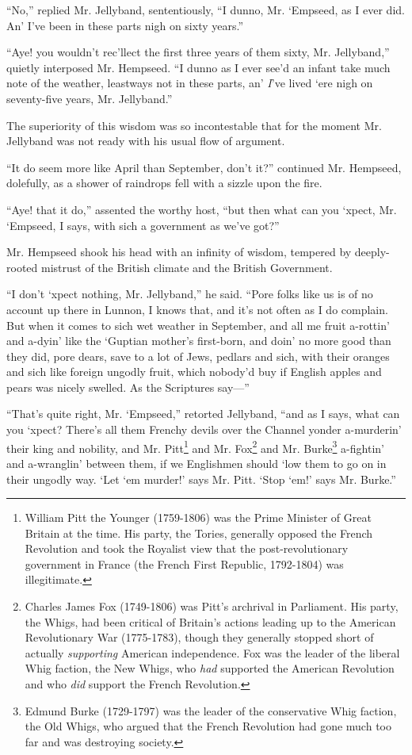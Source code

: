 \documentclass[paper=a5,BCOR=7mm,twoside,DIV=calc,12pt,usegeometry,chapterprefix,endperiod,headings=big]{scrbook}
\begin{document}
\enquote{No,} replied Mr. Jellyband, sententiously, \enquote{I dunno, Mr. `Empseed, as I ever did. An’ I've been in these parts nigh on sixty years.}

\enquote{Aye! you wouldn't rec'llect the first three years of them sixty, Mr. Jellyband,} quietly interposed Mr. Hempseed. \enquote{I dunno as I ever see'd an infant take much note of the weather, leastways not in these parts, an’ \textit{I}'ve lived `ere nigh on seventy-five years, Mr. Jellyband.}

The superiority of this wisdom was so incontestable that for the moment Mr. Jellyband was not ready with his usual flow of argument.

\enquote{It do seem more like April than September, don't it?} continued Mr. Hempseed, dolefully, as a shower of raindrops fell with a sizzle upon the fire.

\enquote{Aye! that it do,} assented the worthy host, \enquote{but then what can you `xpect, Mr. `Empseed, I says, with sich a government as we've got?}

Mr. Hempseed shook his head with an infinity of wisdom, tempered by deeply-rooted mistrust of the British climate and the British Government.

\enquote{I don't `xpect nothing, Mr. Jellyband,} he said. \enquote{Pore folks like us is of no account up there in Lunnon, I knows that, and it's not often as I do complain. But when it comes to sich wet weather in September, and all me fruit a-rottin’ and a-dyin’ like the `Guptian mother's first-born, and doin’ no more good than they did, pore dears, save to a lot of Jews, pedlars and sich, with their oranges and sich like foreign ungodly fruit, which nobody'd buy if English apples and pears was nicely swelled. As the Scriptures say---}

\enquote{That's quite right, Mr. `Empseed,} retorted Jellyband, \enquote{and as I says, what can you `xpect? There's all them Frenchy devils over the Channel yonder a-murderin’ their king and nobility, and Mr. Pitt\footnote{William Pitt the Younger (1759-1806) was the Prime Minister of Great Britain at the time. His party, the Tories, generally opposed the French Revolution and took the Royalist view that the post-revolutionary government in France (the French First Republic, 1792-1804) was illegitimate.} and Mr. Fox\footnote{Charles James Fox (1749-1806) was Pitt's archrival in Parliament. His party, the Whigs, had been critical of Britain's actions leading up to the American Revolutionary War (1775-1783), though they generally stopped short of actually \textit{supporting} American independence. Fox was the leader of the liberal Whig faction, the New Whigs, who \textit{had} supported the American Revolution and who \textit{did} support the French Revolution.} and Mr. Burke\footnote{Edmund Burke (1729-1797) was the leader of the conservative Whig faction, the Old Whigs, who argued that the French Revolution had gone much too far and was destroying society.}  a-fightin’ and a-wranglin’ between them, if we Englishmen should `low them to go on in their ungodly way. \enquote{Let `em murder!} says Mr. Pitt. \enquote{Stop `em!} says Mr. Burke.}
\end{document}
